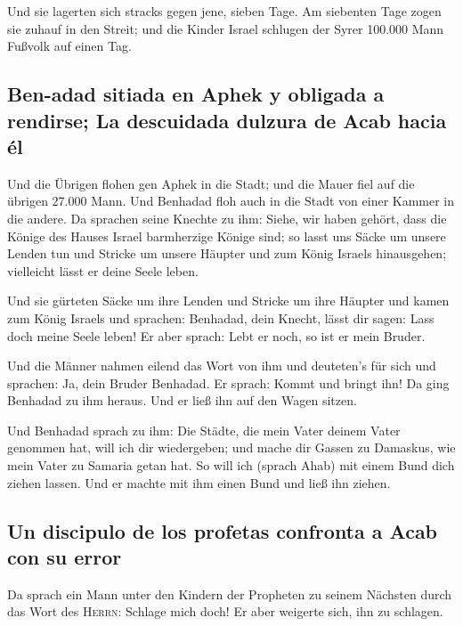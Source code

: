  Und sie lagerten sich stracks gegen jene, sieben Tage.
Am siebenten Tage zogen sie zuhauf in den Streit; und die Kinder Israel
schlugen der Syrer 100.000 Mann Fußvolk auf einen Tag.

\hypertarget{ben-adad-sitiada-en-aphek-y-obligada-a-rendirse-la-descuidada-dulzura-de-acab-hacia-uxe9l}{%
\subsection{Ben-adad sitiada en Aphek y obligada a rendirse; La
descuidada dulzura de Acab hacia
él}\label{ben-adad-sitiada-en-aphek-y-obligada-a-rendirse-la-descuidada-dulzura-de-acab-hacia-uxe9l}}

 Und die Übrigen flohen gen Aphek in die Stadt; und die
Mauer fiel auf die übrigen 27.000 Mann. Und Benhadad floh auch in die
Stadt von einer Kammer in die andere.  Da sprachen seine
Knechte zu ihm: Siehe, wir haben gehört, dass die Könige des Hauses
Israel barmherzige Könige sind; so lasst uns Säcke um unsere Lenden tun
und Stricke um unsere Häupter und zum König Israels hinausgehen;
vielleicht lässt er deine Seele leben.

 Und sie gürteten Säcke um ihre Lenden und Stricke um
ihre Häupter und kamen zum König Israels und sprachen: Benhadad, dein
Knecht, lässt dir sagen: Lass doch meine Seele leben! Er aber sprach:
Lebt er noch, so ist er mein Bruder.

 Und die Männer nahmen eilend das Wort von ihm und
deuteten's für sich und sprachen: Ja, dein Bruder Benhadad. Er sprach:
Kommt und bringt ihn! Da ging Benhadad zu ihm heraus. Und er ließ ihn
auf den Wagen sitzen.

 Und Benhadad sprach zu ihm: Die Städte, die mein Vater
deinem Vater genommen hat, will ich dir wiedergeben; und mache dir
Gassen zu Damaskus, wie mein Vater zu Samaria getan hat. So will ich
(sprach Ahab) mit einem Bund dich ziehen lassen. Und er machte mit ihm
einen Bund und ließ ihn ziehen.

\hypertarget{un-discipulo-de-los-profetas-confronta-a-acab-con-su-error}{%
\subsection{Un discipulo de los profetas confronta a Acab con su
error}\label{un-discipulo-de-los-profetas-confronta-a-acab-con-su-error}}

 Da sprach ein Mann unter den Kindern der Propheten zu
seinem Nächsten durch das Wort des \textsc{Herrn}: Schlage mich doch! Er
aber weigerte sich, ihn zu schlagen.

